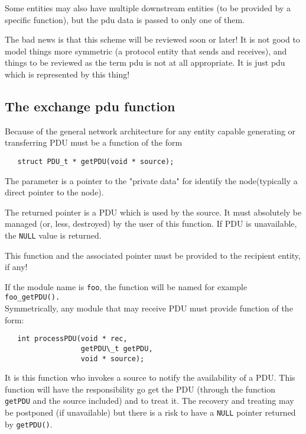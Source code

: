    Some entities may also have multiple downstream entities
(to be provided by a specific function), but the {\sc pdu}
data is passed to only one of them.

   
    The bad news is that this scheme will be reviewed soon
or later! It is not good to model things more
symmetric (a protocol entity that sends and receives), and
things to be reviewed as the term {\sc pdu} is not at all
appropriate. It is just {\sc pdu} which is represented by
this thing!

%
\subsection{The exchange {\sc pdu} function}

   Because of the general network architecture for any entity capable
generating or transferring PDU must be a function of the form

\begin{verbatim}
   struct PDU_t * getPDU(void * source);
\end{verbatim}

   The parameter is a pointer to the "private data" for
identify the node(typically a direct pointer to the node).

   The returned pointer is a PDU which is used by the source. 
It must absolutely be managed (or, less, destroyed) by the user of this function. 
If PDU is unavailable, the {\tt NULL} value is returned.

   This function and the associated pointer must be provided to
the recipient entity, if any!

    If the module name is {\tt foo}, the function will be named for example
{\tt foo\_getPDU().}\\

    Symmetrically, any module that may receive PDU must provide
function of the form:

\begin{verbatim}
   int processPDU(void * rec,
                  getPDU\_t getPDU,
                  void * source);
\end{verbatim}

   
    It is this function who invokes a source to notify the
availability of a PDU. This function will have the responsibility
go get the PDU (through the function \lstinline!getPDU! and the source included) 
and to treat it. The recovery and treating may
be postponed (if unavailable) but there is a risk to 
have a \lstinline!NULL! pointer returned by
\lstinline!getPDU()!.

